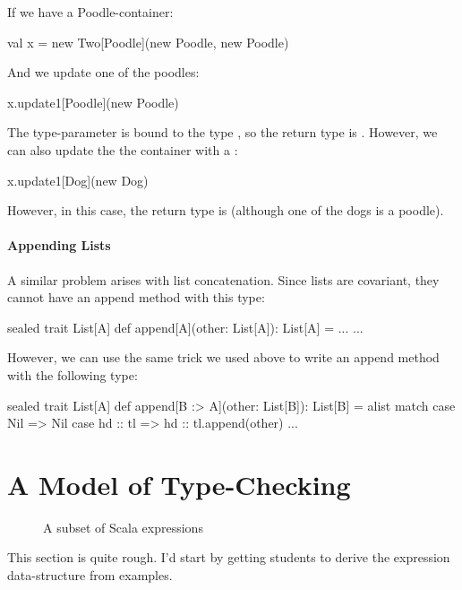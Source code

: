 \documentclass[9pt]{extbook}
\begin{document}
If we have a Poodle-container:
\begin{scalacode}
val x = new Two[Poodle](new Poodle, new Poodle)
\end{scalacode}
And we update one of the poodles:
\begin{scalacode}
x.update1[Poodle](new Poodle)
\end{scalacode}
The type-parameter  is bound to the type ,
so the return type is . However, we can also
update the the container with a :
\begin{scalacode}
x.update1[Dog](new Dog)
\end{scalacode}
However, in this case, the return type is  (although one
of the dogs is a poodle).

\paragraph{Appending Lists}
A similar problem arises with list concatenation. Since lists are covariant,
they cannot have an append method with this type:
\begin{scalacode}
sealed trait List[A] {
  def append[A](other: List[A]): List[A] = ...
  ...
}
\end{scalacode}

However, we can use the same trick we used above to write an append
method with the following type:

\begin{scalacode}
sealed trait List[A] {
  def append[B :> A](other: List[B]): List[B] = alist match {
    case Nil => Nil
    case hd :: tl => hd :: tl.append(other)
  }
  ...
}
\end{scalacode}

\section{A Model of Type-Checking}

\begin{figure}
\caption{A subset of Scala expressions}\label{scalafragment}
\end{figure}

\begin{instructor}
This section is quite rough. I'd start by getting students to derive the expression data-structure from examples.
\end{instructor}
\end{document}
